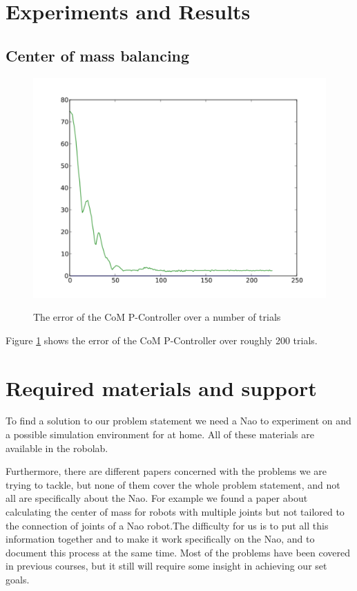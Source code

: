 \documentclass[a4paper]{article}
\begin{document}
\section{Experiments and Results}
\subsection{Center of mass balancing}
\begin{figure}[htb]
	\centering
	\includegraphics[width=1\textwidth]{pics/com_error__threshold_3__gain_0_0005.pdf}
	\label{fig:com_plot}
	\caption{The error of the CoM P-Controller over a number of trials}
\end{figure}

Figure \ref{fig:com_plot} shows the error of the CoM P-Controller over roughly 200
trials.

\section{Required materials and support} 
To find a solution to our problem statement we need a Nao to experiment on and a
possible simulation environment for at home. All of these materials are
available in the robolab.

Furthermore, there are different papers concerned with the problems we are
trying to tackle, but none of them cover the whole problem statement, and not
all are specifically about the Nao. For example we found a paper about
calculating the center of mass for robots with multiple joints\cite{Cotton2008} but not tailored
to the connection of joints of a  Nao robot.The difficulty for us is to put all this
information together and to make it work specifically on the Nao, and to
document this process at the same time. Most of the problems have been covered
in previous courses, but it still will require some insight in achieving our set
goals.




\end{document}
